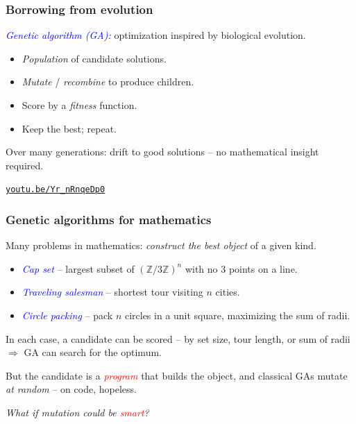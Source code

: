 \documentclass{beamer}
\theoremstyle{definition}
\newcommand\ZZ{\mathbb{Z}}
\newcommand\remph[1]{\emph{\textcolor{red}{#1}}}
\newcommand\bemph[1]{\emph{\textcolor{blue}{#1}}}
\begin{document}
\begin{frame}
  \frametitle{Borrowing from evolution}
  \bemph{Genetic algorithm (GA):} optimization inspired by biological evolution.
  \pause
  \vspace{.3cm}

  \begin{itemize}
    \item[$\bullet$] \emph{Population} of candidate solutions.
      \pause
    \item[$\bullet$] \emph{Mutate} / \emph{recombine} to produce children.
      \pause
    \item[$\bullet$] Score by a \emph{fitness} function.
      \pause
    \item[$\bullet$] Keep the best; repeat.
  \end{itemize}
  \pause
  \vspace{.3cm}

  Over many generations: drift to good solutions -- no mathematical insight required.
  \pause
  \vspace{.4cm}

  \begin{center}
    \href{https://youtu.be/Yr_nRnqeDp0}{\texttt{youtu.be/Yr\_nRnqeDp0}}
  \end{center}
\end{frame}


\begin{frame}
  \frametitle{Genetic algorithms for mathematics}
  Many problems in mathematics: \emph{construct the best object} of a
  given kind.
  \pause
  \vspace{.25cm}

  \begin{itemize}
    \setlength{\itemsep}{.12cm}
    \item[$\bullet$] \bemph{Cap set} -- largest subset of \( (\ZZ/3\ZZ)^n \)
      with no 3 points on a line.
    \item[$\bullet$] \bemph{Traveling salesman} -- shortest tour visiting
      \( n \) cities.
    \item[$\bullet$] \bemph{Circle packing} -- pack \( n \) circles in a unit
      square, maximizing the sum of radii.
  \end{itemize}
  \pause
  \vspace{.25cm}

  In each case, a candidate can be scored -- by set size,
  tour length, or sum of radii \(\Rightarrow\) GA can search for the optimum.
  \pause
  \vspace{.25cm}

  But the candidate is a \remph{program} that builds the object, and
  classical GAs mutate \emph{at random} -- on code, hopeless.
  \pause
  \vspace{.2cm}

  \begin{center}
    \emph{What if mutation could be \remph{smart}?}
  \end{center}
\end{frame}
\end{document}
